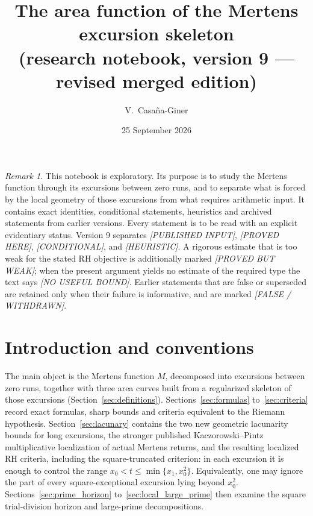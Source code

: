 \documentclass[11pt]{amsart}
\title[The area function of the Mertens excursion skeleton]{The area function of the Mertens excursion skeleton\\
(research notebook, version 9 --- revised merged edition)}
\author{V.~Casa\~na-Giner}
\date{25 September 2026}
\numberwithin{equation}{section}
\theoremstyle{plain}
\theoremstyle{definition}
\theoremstyle{remark}
\newtheorem{remark}[theorem]{Remark}
\begin{document}
\maketitle

\tableofcontents

\bigskip

\begin{remark}
\label{rem:exploratory_nature}
This notebook is exploratory. Its purpose is to study the Mertens function
through its excursions between zero runs, and to separate what is
forced by the local geometry of those excursions from what requires
arithmetic input. It contains exact identities, conditional statements,
heuristics and archived statements from earlier versions. Every statement
is to be read with an explicit evidentiary status. Version 9 separates
\emph{[PUBLISHED INPUT]}, \emph{[PROVED HERE]}, \emph{[CONDITIONAL]}, and
\emph{[HEURISTIC]}.  A rigorous estimate that is too weak for the stated RH
objective is additionally marked \emph{[PROVED BUT WEAK]}; when the present
argument yields no estimate of the required type the text says
\emph{[NO USEFUL BOUND]}. Earlier statements that are false or superseded are
retained only when their failure is informative, and are marked
\emph{[FALSE / WITHDRAWN]}.
\end{remark}

\section{Introduction and conventions}
\label{sec:introduction}

The main object is the Mertens function $M$, decomposed into excursions
between zero runs, together with three area curves built from a
regularized skeleton of those excursions
(Section~\ref{sec:definitions}). Sections~\ref{sec:formulas}
to~\ref{sec:criteria} record exact formulas, sharp bounds and criteria
equivalent to the Riemann hypothesis. Section~\ref{sec:lacunary} contains
the two new geometric lacunarity bounds for long excursions, the stronger
published Kaczorowski--Pintz multiplicative localization of actual Mertens
returns, and the resulting localized RH criteria, including the
square-truncated criterion: in each excursion it is enough to
control the range $x_0<t\le\min\{x_1,x_0^2\}$.  Equivalently, one may ignore
the part of every square-exceptional excursion lying beyond $x_0^2$.
Sections~\ref{sec:prime_horizon} to~\ref{sec:local_large_prime} then examine
the square trial-division horizon and large-prime decompositions.
\end{document}
